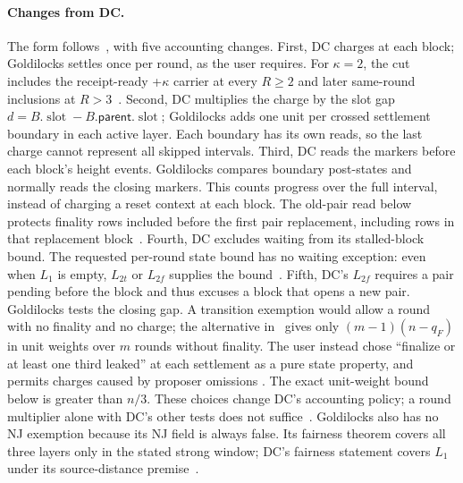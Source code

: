\documentclass{article}
\theoremstyle{plain}
\theoremstyle{definition}
\theoremstyle{remark}
\newcommand{\slot}{\operatorname{slot}}
\newcommand{\parent}{\mathsf{parent}}
\newcommand{\DC}[1]{\cite[\S#1]{DC}}
\begin{document}
\paragraph{Changes from DC.}
The form follows~\DC{8}, with five accounting changes.
First, DC charges at each block; Goldilocks settles once per round, as the
user requires.  For $\kappa=2$, the cut includes the receipt-ready +$\kappa$
carrier at every $R\geq2$
and later same-round inclusions at $R>3$~\cite[\S2]{LS183}.
Second, DC multiplies the charge by the slot gap
$d=B.\slot-B.\parent.\slot$; Goldilocks adds one unit per crossed
settlement boundary in each active layer.  Each boundary has its own
reads, so the last charge cannot represent all skipped intervals.
Third, DC reads the markers before each block's height events.
Goldilocks compares boundary post-states and normally reads the closing
markers.  This counts progress over the full interval, instead of
charging a reset context at each block.  The old-pair read below
protects finality rows included before the first pair replacement,
including rows in that replacement block~\cite[\S\S2--3]{LS183}.
Fourth, DC excludes waiting from its stalled-block bound.  The requested
per-round state bound has no waiting exception: even when $L_1$ is
empty, $L_{2t}$ or $L_{2f}$ supplies the bound~\cite[\S3.2]{RL179}.
Fifth, DC's $L_{2f}$ requires a pair pending before the block and thus
excuses a block that opens a new pair.  Goldilocks tests the closing gap.
A transition exemption would allow a round with no finality and no
charge; the alternative in~\cite[\S\S1,3.3,6.1]{RL179} gives only
$(m-1)(n-q_F)$ in unit weights over $m$ rounds without finality.  The user instead chose
``finalize or at least one third leaked'' at each settlement as a pure
state property, and permits charges caused by proposer omissions
\cite[\S1]{LS183}.  The exact unit-weight bound below is greater than
$n/3$.  These choices change DC's accounting policy; a round multiplier
alone with DC's other tests does not suffice~\cite[\S6.1]{RL179}.
Goldilocks also has no NJ exemption because its NJ field is always false.
Its fairness theorem covers all three layers only in the stated strong
window; DC's fairness statement covers $L_1$ under its source-distance
premise~\DC{8}.
\end{document}
